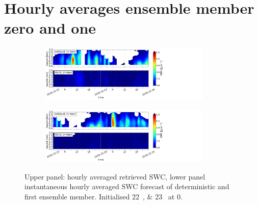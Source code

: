 \section{Hourly averages ensemble member zero and one}%
\label{app:EM1h}

\begin{figure}[H]%
		\centering
		\begin{subfigure}[t]{\textwidth}
    \centering
    	\includegraphics[trim={0.cm 0.8cm 19.cm 0.5cm},clip,width=0.9\textwidth]{./fig_vert_SWC_1h/20161222}
		\caption{}\label{fig:SWC1h:22}
    \end{subfigure}
		\begin{subfigure}[t]{\textwidth}
    \centering
    	\includegraphics[trim={0.cm 0.8cm 19.cm 0.5cm},clip,width=0.9\textwidth]{./fig_vert_SWC_1h/20161223}
		\caption{}\label{fig:SWC1h:23}
    \end{subfigure}
    \caption{Upper panel: hourly averaged retrieved SWC, lower panel instantaneous hourly averaged SWC forecast of deterministic and first ensemble member. Initialised \SIlist{22;23}{\dec} at \SI{0}{\UTC}. }\label{fig:SWC_1h}
 \end{figure}
